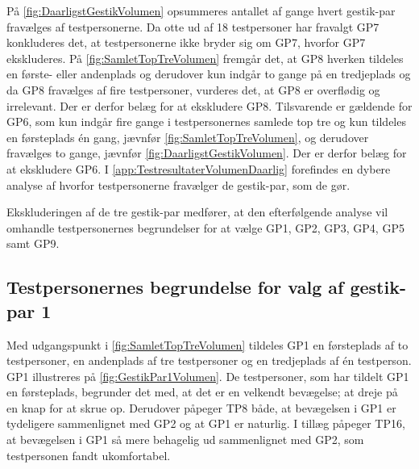 På \autoref{fig:DaarligstGestikVolumen} opsummeres antallet af gange hvert gestik-par fravælges af testpersonerne. Da otte ud af 18 testpersoner har fravalgt GP7 konkluderes det, at testpersonerne ikke bryder sig om GP7, hvorfor GP7 ekskluderes. På \autoref{fig:SamletTopTreVolumen} fremgår det, at GP8 hverken tildeles en første- eller andenplads og derudover kun indgår to gange på en tredjeplads og da GP8 fravælges af fire testpersoner, vurderes det, at GP8 er overflødig og irrelevant. Der er derfor belæg for at ekskludere GP8. Tilsvarende er gældende for GP6, som kun indgår fire gange i testpersonernes samlede top tre og kun tildeles en førsteplads én gang, jævnfør \autoref{fig:SamletTopTreVolumen}, og derudover fravælges to gange, jævnfør \autoref{fig:DaarligstGestikVolumen}. Der er derfor belæg for at ekskludere GP6. I \autoref{app:TestresultaterVolumenDaarlig} forefindes en dybere analyse af hvorfor testpersonerne fravælger de gestik-par, som de gør. 

Ekskluderingen af de tre gestik-par medfører, at den efterfølgende analyse vil omhandle testpersonernes begrundelser for at vælge GP1, GP2, GP3, GP4, GP5 samt GP9.
%
\subsection{Testpersonernes begrundelse for valg af gestik-par 1}
\label{TestresultaterValgAfGestikkerBegrundelseGP1Volumen}
%
Med udgangspunkt i \autoref{fig:SamletTopTreVolumen} tildeles GP1 en førsteplads af to testpersoner, en andenplads af tre testpersoner og en tredjeplads af én testperson. GP1 illustreres på \autoref{fig:GestikPar1Volumen}. De testpersoner, som har tildelt GP1 en førsteplads, begrunder det med, at det er en velkendt bevægelse; at dreje på en knap for at skrue op. Derudover påpeger TP8 både, at bevægelsen i GP1 er tydeligere sammenlignet med GP2 og at GP1 er naturlig. I tillæg påpeger TP16, at bevægelsen i GP1 så mere behagelig ud sammenlignet med GP2, som testpersonen fandt ukomfortabel. 

